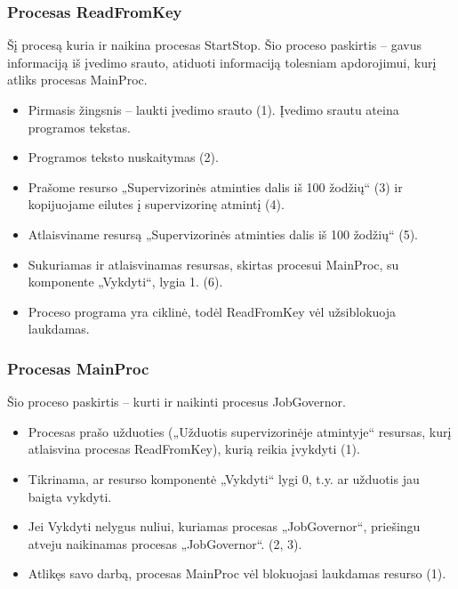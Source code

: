 \subsubsection{Procesas ReadFromKey}
Šį procesą kuria ir naikina procesas StartStop. Šio proceso paskirtis – gavus informaciją iš įvedimo srauto, atiduoti informaciją tolesniam apdorojimui, kurį atliks procesas MainProc.
	\begin{itemize}
		\item Pirmasis žingsnis – laukti įvedimo srauto (1).  Įvedimo srautu ateina programos tekstas.
		\item Programos teksto nuskaitymas (2).
		\item Prašome resurso „Supervizorinės atminties dalis iš 100 žodžių“ (3) ir kopijuojame eilutes į supervizorinę atmintį (4).
		\item Atlaisviname resursą „Supervizorinės atminties dalis iš 100 žodžių“ (5).
		\item Sukuriamas ir atlaisvinamas resursas, skirtas procesui MainProc, su komponente „Vykdyti“, lygia 1. (6). 
		\item Proceso programa yra ciklinė, todėl ReadFromKey vėl užsiblokuoja laukdamas.
	\end{itemize}
\subsubsection{Procesas MainProc}
Šio proceso paskirtis – kurti ir naikinti procesus JobGovernor.
	\begin{itemize}
		\item Procesas prašo užduoties („Užduotis supervizorinėje atmintyje“ resursas, kurį atlaisvina procesas ReadFromKey), kurią reikia įvykdyti (1).
		\item Tikrinama, ar resurso komponentė „Vykdyti“ lygi 0, t.y. ar užduotis jau baigta vykdyti.
		\item Jei Vykdyti nelygus nuliui, kuriamas procesas „JobGovernor“, priešingu atveju naikinamas procesas „JobGovernor“. (2, 3).
		\item Atlikęs savo darbą, procesas MainProc vėl blokuojasi laukdamas resurso (1).
	\end{itemize}
